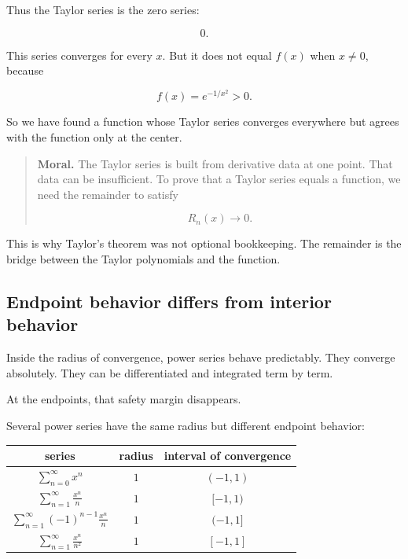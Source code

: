 Thus the Taylor series is the zero series:

\[
\boxed{
0.
}
\]

This series converges for every \(x\).  But it does not equal \(f(x)\) when \(x\neq0\),
because

\[
f(x)=e^{-1/x^2}>0.
\]

So we have found a function whose Taylor series converges everywhere but agrees with
the function only at the center.

\begin{quote}
\textbf{Moral.}
The Taylor series is built from derivative data at one point.  That data can be
insufficient.  To prove that a Taylor series equals a function, we need the remainder
to satisfy

\[
R_n(x)\to0.
\]
\end{quote}

This is why Taylor's theorem was not optional bookkeeping.  The remainder is the
bridge between the Taylor polynomials and the function.

\subsection{Endpoint behavior differs from interior behavior}
\label{subsec:endpoint-behavior-differs}

Inside the radius of convergence, power series behave predictably.  They converge
absolutely.  They can be differentiated and integrated term by term.

At the endpoints, that safety margin disappears.

Several power series have the same radius but different endpoint behavior:

\begin{center}
\renewcommand{\arraystretch}{1.45}
\begin{tabular}{c|c|c}
\textbf{series} & \textbf{radius} & \textbf{interval of convergence} \\ \hline
\(\displaystyle \sum_{n=0}^{\infty}x^n\) &
\(1\) &
\((-1,1)\) \\

\(\displaystyle \sum_{n=1}^{\infty}\frac{x^n}{n}\) &
\(1\) &
\([-1,1)\) \\

\(\displaystyle \sum_{n=1}^{\infty}(-1)^{n-1}\frac{x^n}{n}\) &
\(1\) &
\((-1,1]\) \\

\(\displaystyle \sum_{n=1}^{\infty}\frac{x^n}{n^2}\) &
\(1\) &
\([-1,1]\)
\end{tabular}
\end{center}


